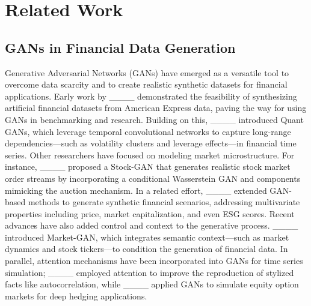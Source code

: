 \section{Related Work}
\subsection{GANs in Financial Data Generation}
Generative Adversarial Networks (GANs) have emerged as a versatile tool to overcome data scarcity and to create realistic synthetic datasets for financial applications. Early work by ____ demonstrated the feasibility of synthesizing artificial financial datasets from American Express data, paving the way for using GANs in benchmarking and research. Building on this, ____ introduced Quant GANs, which leverage temporal convolutional networks to capture long-range dependencies—such as volatility clusters and leverage effects—in financial time series.
Other researchers have focused on modeling market microstructure. For instance, ____ proposed a Stock-GAN that generates realistic stock market order streams by incorporating a conditional Wasserstein GAN and components mimicking the auction mechanism. In a related effort, ____ extended GAN-based methods to generate synthetic financial scenarios, addressing multivariate properties including price, market capitalization, and even ESG scores. Recent advances have also added control and context to the generative process. ____ introduced Market-GAN, which integrates semantic context—such as market dynamics and stock tickers—to condition the generation of financial data. In parallel, attention mechanisms have been incorporated into GANs for time series simulation; ____ employed attention to improve the reproduction of stylized facts like autocorrelation, while ____ applied GANs to simulate equity option markets for deep hedging applications.

